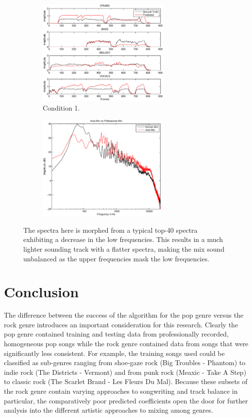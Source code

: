 \documentclass{article}
\begin{document}
\begin{figure}[!htbp]
\centering
\begin{subfigure}{\columnwidth}
\includegraphics[height=200px, width=\columnwidth]{corssgenre1.eps}%
\caption{Condition 1.}
\label{subfiga}%
\end{subfigure}%
\begin{subfigure}{\columnwidth}
\includegraphics[height=200px, width=\columnwidth]{cross_genrespectra.eps}
\label{subfigb}%
\end{subfigure}%
\caption{The spectra here is morphed from a typical top-40 spectra exhibiting a decrease in the low frequencies. This results in a much lighter sounding track with a flatter spectra, making the mix sound unbalanced as the upper frequencies mask the low frequencies.}
\label{fig:crossgenre}
\end{figure}

\section{Conclusion}
\label{sec:Conclusion}

The difference between the success of the algorithm for the pop genre versus the rock genre introduces an important consideration for this research.  Clearly the pop genre contained training and testing data from professionally recorded, homogeneous pop songs while the rock genre contained data from songs that were significantly less consistent.  For example, the training songs used could be classified as sub-genres ranging from shoe-gaze rock (Big Troubles - Phantom) to indie rock (The Districts - Vermont) and from punk rock (Meaxic - Take A Step) to classic rock (The Scarlet Brand - Les Fleurs Du Mal).  Because these subsets of the rock genre contain varying approaches to songwriting and track balance in particular, the comparatively poor predicted coefficients open the door for further analysis into the different artistic approaches to mixing among genres.  
\end{document}

